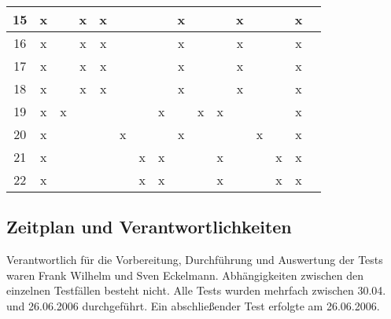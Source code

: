 \begin{longtable}{|c|c|c|c|c|c|c|c|c|c|c|c|c|c|c|c|}
15 & x &   & x & x &   &   &   & x &   &   & x &   &   & x &  \\\hline
16 & x &   & x & x &   &   &   & x &   &   & x &   &   & x &  \\\hline
17 & x &   & x & x &   &   &   & x &   &   & x &   &   & x &  \\\hline
18 & x &   & x & x &   &   &   & x &   &   & x &   &   & x &  \\\hline
19 & x & x &   &   &   &   & x &   & x & x &   &   &   & x &  \\\hline
20 & x &   &   &   & x &   &   & x &   &   &   & x &   & x &  \\\hline
21 & x &   &   &   &   & x & x &   &   & x &   &   & x & x &  \\\hline
22 & x &   &   &   &   & x & x &   &   & x &   &   & x & x &  \\\hline
\end{longtable}

\subsection{Zeitplan und Verantwortlichkeiten}
Verantwortlich für die Vorbereitung, Durchführung und Auswertung der Tests waren Frank Wilhelm und Sven Eckelmann. Abhängigkeiten zwischen den einzelnen Testfällen besteht nicht. Alle Tests wurden mehrfach zwischen 30.04. und 26.06.2006 durchgeführt. Ein abschließender Test erfolgte am 26.06.2006.

